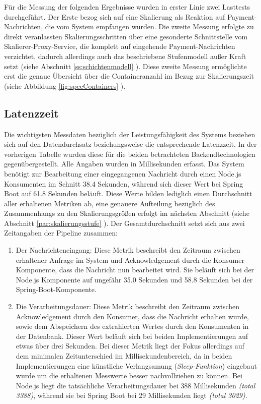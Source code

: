 Für die Messung der folgenden Ergebnisse wurden in erster Linie zwei Lasttests durchgeführt. Der Erste bezog sich auf eine Skalierung als Reaktion auf Payment-Nachrichten, die vom System empfangen wurden. Die zweite Messung erfolgte zu direkt veranlassten Skalierungsschritten über eine gesonderte Schnittstelle vom Skalierer-Proxy-Service, die komplett auf eingehende Payment-Nachrichten verzichtet, dadurch allerdings auch das beschriebene Stufenmodell außer Kraft setzt (siehe Abschnitt \ref{ss:schichtenmodell} ). Diese zweite Messung ermöglichte erst die genaue Übersicht über die Containeranzahl im Bezug zur Skalierungszeit (siehe Abbildung \ref{fig:specContainers} ).


\subsection{Latenzzeit}
Die wichtigsten Messdaten bezüglich der Leistungsfähigkeit des Systems beziehen sich auf den Datendurchsatz beziehungsweise die entsprechende Latenzzeit. In der vorherigen Tabelle wurden diese für die beiden betrachteten Backendtechnologien gegenübergestellt. Alle Angaben wurden in Millisekunden erfasst. Das System benötigt zur Bearbeitung einer eingegangenen Nachricht durch einen Node.js Konsumenten im Schnitt 38.4 Sekunden, während sich dieser Wert bei Spring Boot auf 61.8 Sekunden beläuft. Diese Werte bilden lediglich einen Durchschnitt aller erhaltenen Metriken ab, eine genauere Aufteilung bezüglich des Zusammenhangs zu den Skalierungsgrößen erfolgt im nächsten Abschnitt (siehe Abschnitt \ref{par:skalierungsstufe} ). Der Gesamtdurchschnitt setzt sich aus zwei Zeitangaben der Pipeline zusammen: 

\begin{enumerate}
  \item Der Nachrichteneingang: Diese Metrik beschreibt den Zeitraum zwischen erhaltener Anfrage im System und Acknowledgement durch die Konsumer-Komponente, dass die Nachricht nun bearbeitet wird. Sie beläuft sich bei der Node.js Komponente auf ungefähr 35.0 Sekunden und 58.8 Sekunden bei der Spring-Boot-Komponente. 
  \item Die Verarbeitungsdauer: Diese Metrik beschreibt den Zeitraum zwischen Acknowledgement durch den Konsumer, dass die Nachricht erhalten wurde, sowie dem Abspeichern des extrahierten Wertes durch den Konsumenten in der Datenbank. Dieser Wert beläuft sich bei beiden Implementierungen auf etwas über drei Sekunden. Bei dieser Metrik liegt der Fokus allerdings auf dem minimalen Zeitunterschied im Millisekundenbereich, da in beiden Implementierungen eine künstliche Verlangsamung (\emph{Sleep-Funktion}) eingebaut wurde um die erhaltenen Messwerte besser nachvollziehen zu können. Bei Node.js liegt die tatsächliche Verarbeitungsdauer bei 388 Millisekunden \emph{(total 3388)}, während sie bei Spring Boot bei 29 Millisekunden liegt \emph{(total 3029)}.
\end{enumerate}

